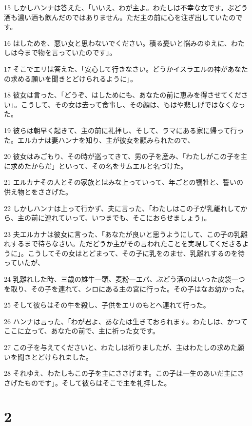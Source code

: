 \par 15 しかしハンナは答えた、「いいえ、わが主よ。わたしは不幸な女です。ぶどう酒も濃い酒も飲んだのではありません。ただ主の前に心を注ぎ出していたのです。
\par 16 はしためを、悪い女と思わないでください。積る憂いと悩みのゆえに、わたしは今まで物を言っていたのです」。
\par 17 そこでエリは答えた、「安心して行きなさい。どうかイスラエルの神があなたの求める願いを聞きとどけられるように」。
\par 18 彼女は言った、「どうぞ、はしためにも、あなたの前に恵みを得させてください」。こうして、その女は去って食事し、その顔は、もはや悲しげではなくなった。
\par 19 彼らは朝早く起きて、主の前に礼拝し、そして、ラマにある家に帰って行った。エルカナは妻ハンナを知り、主が彼女を顧みられたので、
\par 20 彼女はみごもり、その時が巡ってきて、男の子を産み、「わたしがこの子を主に求めたからだ」といって、その名をサムエルと名づけた。
\par 21 エルカナその人とその家族とはみな上っていって、年ごとの犠牲と、誓いの供え物とをささげた。
\par 22 しかしハンナは上って行かず、夫に言った、「わたしはこの子が乳離れしてから、主の前に連れていって、いつまでも、そこにおらせましょう」。
\par 23 夫エルカナは彼女に言った、「あなたが良いと思うようにして、この子の乳離れするまで待ちなさい。ただどうか主がその言われたことを実現してくださるように」。こうしてその女はとどまって、その子に乳をのませ、乳離れするのを待っていたが、
\par 24 乳離れした時、三歳の雄牛一頭、麦粉一エパ、ぶどう酒のはいった皮袋一つを取り、その子を連れて、シロにある主の宮に行った。その子はなお幼かった。
\par 25 そして彼らはその牛を殺し、子供をエリのもとへ連れて行った。
\par 26 ハンナは言った、「わが君よ、あなたは生きておられます。わたしは、かつてここに立って、あなたの前で、主に祈った女です。
\par 27 この子を与えてくださいと、わたしは祈りましたが、主はわたしの求めた願いを聞きとどけられました。
\par 28 それゆえ、わたしもこの子を主にささげます。この子は一生のあいだ主にささげたものです」。そして彼らはそこで主を礼拝した。

\chapter{2}

